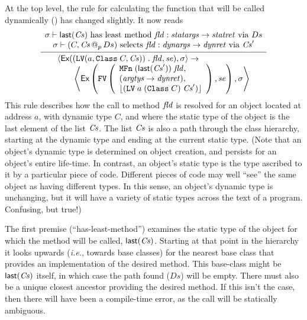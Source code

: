 \documentclass[11pt]{article}
\newcommand{\ie}{\emph{i.e.}}
\begin{document}
At the top level, the rule for calculating the function that will be
called dynamically () has changed
slightly.  It now reads
\[
\infer{
  \begin{array}{l}
    \statebrack{\textsf{Ex}((\clvalue(a,\texttt{Class}\;C,\Cs))\;\mathbf{.}\;
      \fld,\mathit{se}),\sigma} \rightarrow \\
    \qquad\left\langle\textsf{Ex}\left(\cfvalue\left(
        \begin{array}{l}
          \texttt{MFn}\;(\last(\Cs'))\;\fld,\\
          (\funtype{\mathit{argtys}}{\mathit{dynret}}),\\
          \SOME{(\clvalue\;a\;(\texttt{Class}\;C)\;\Cs')}
        \end{array}\right),
      \mathit{se}\right),\sigma\right\rangle
  \end{array}}{
  \begin{array}{c}
    \sigma \vdash \last(\Cs) \textrm{ has least method } \fld :
    \funtype{\mathit{statargs}}{\mathit{statret}} \textrm{ via } Ds \\
    \sigma \vdash (C,\Cs \,@_p\, Ds) \textrm{ selects } \fld :
    \funtype{\mathit{dynargs}}{\mathit{dynret}} \textrm{ via } \Cs'
  \end{array}}
\]
This rule describes how the call to method $\mathit{fld}$ is resolved
for an object located at address $a$, with dynamic type $C$, and where
the static type of the object is the last element of the list $\mathit{Cs}$.
The list $\mathit{Cs}$ is also a path through the class hierarchy, starting at
the dynamic type and ending at the current static type.  (Note that an
object's dynamic type is determined on object creation, and persists
for an object's entire life-time.  In contrast, an object's static
type is the type ascribed to it by a particular piece of code.
Different pieces of code may well ``see'' the same object as having
different types.  In this sense, an object's dynamic type is
unchanging, but it will have a variety of static types across the text
of a program.  Confusing, but true!)

The first premise (``has-least-method'') examines the static type of
the object for which the method will be called, $\textsf{last}(\mathit{Cs})$.
Starting at that point in the hierarchy it looks upwards (\ie, towards
base classes) for the nearest base class that provides an
implementation of the desired method.  This base-class might be
$\textsf{last}(\mathit{Cs})$ itself, in which case the path found ($Ds$) will be
empty.  There must also be a unique closest ancestor providing the
desired method.  If this isn't the case, then there will have been a
compile-time error, as the call will be statically ambiguous.
\end{document}
